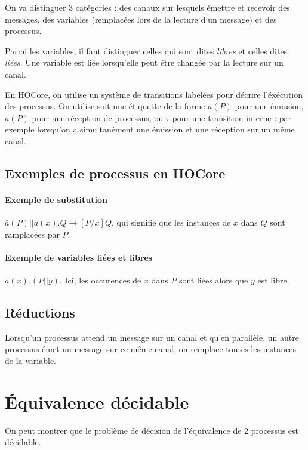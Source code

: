 \documentclass{article}
\begin{document}
On va distinguer 3 catégories : des canaux sur lesquels émettre et recevoir des messages, des variables (remplacées lors de la lecture d'un message) et des processus.

Parmi les variables, il faut distinguer celles qui sont dites \textit{libres} et celles dites \textit{liées}.
Une variable est liée lorsqu'elle peut être changée par la lecture sur un canal. 

En HOCore, on utilise un système de transitions labelées pour décrire l'éxécution des processus. On utilise soit une étiquette de la forme $\bar{a}(P)$ pour une émission, $a(P)$ pour une réception de processus, ou $\tau$ pour une transition interne : par exemple lorsqu'on a simultanément une émission et une réception sur un même canal.


\subsection{Exemples de processus en HOCore}
\paragraph{Exemple de substitution} $\bar{a}(P)||a(x).Q \rightarrow [P/x]Q$, qui signifie que les instances de $x$ dans $Q$ sont ramplacées par $P$.
\paragraph{Exemple de variables liées et libres} $a(x).(P||y)$. Ici, les occurences de $x$ dans $P$ sont liées alors que $y$ est libre. %




\subsection{Réductions}
Lorsqu'un processus attend un message sur un canal et qu'en parallèle, un autre processus émet un message sur ce même canal, on remplace toutes les instances de la variable.




\section{Équivalence décidable}
On peut montrer que le problème de décision de l'équivalence de 2 processus est décidable.
\end{document}
